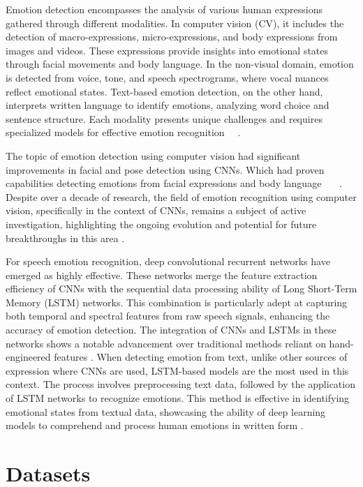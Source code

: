 \documentclass[runningheads]{llncs}
\begin{document}
Emotion detection encompasses the analysis of various human expressions gathered through different modalities. In computer vision (CV), it includes the detection of macro-expressions, micro-expressions, and body expressions from images and videos. These expressions provide insights into emotional states through facial movements and body language. In the non-visual domain, emotion is detected from voice, tone, and speech spectrograms, where vocal nuances reflect emotional states. Text-based emotion detection, on the other hand, interprets written language to identify emotions, analyzing word choice and sentence structure. Each modality presents unique challenges and requires specialized models for effective emotion recognition \cite{Chul2018}~\cite{Trigeorgis2016}~\cite{Karna2020}.

The topic of emotion detection using computer vision had significant improvements in facial and pose detection using CNNs. Which had proven capabilities detecting emotions from facial expressions and body language \cite{Hayale2023}~\cite{Kosti2020}~\cite{Gorbova2019}~\cite{Romeo2021}. Despite over a decade of research, the field of emotion recognition using computer vision, specifically in the context of CNNs, remains a subject of active investigation, highlighting the ongoing evolution and potential for future breakthroughs in this area \cite{Chul2018}.

For speech emotion recognition, deep convolutional recurrent networks have emerged as highly effective. These networks merge the feature extraction efficiency of CNNs with the sequential data processing ability of Long Short-Term Memory (LSTM) networks. This combination is particularly adept at capturing both temporal and spectral features from raw speech signals, enhancing the accuracy of emotion detection. The integration of CNNs and LSTMs in these networks shows a notable advancement over traditional methods reliant on hand-engineered features \cite{Trigeorgis2016}. When detecting emotion from text, unlike other sources of expression where CNNs are used, LSTM-based models are the most used in this context. The process involves preprocessing text data, followed by the application of LSTM networks to recognize emotions. This method is effective in identifying emotional states from textual data, showcasing the ability of deep learning models to comprehend and process human emotions in written form \cite{Karna2020}.


\section{Datasets}
\label{sec:datasets}
\end{document}
